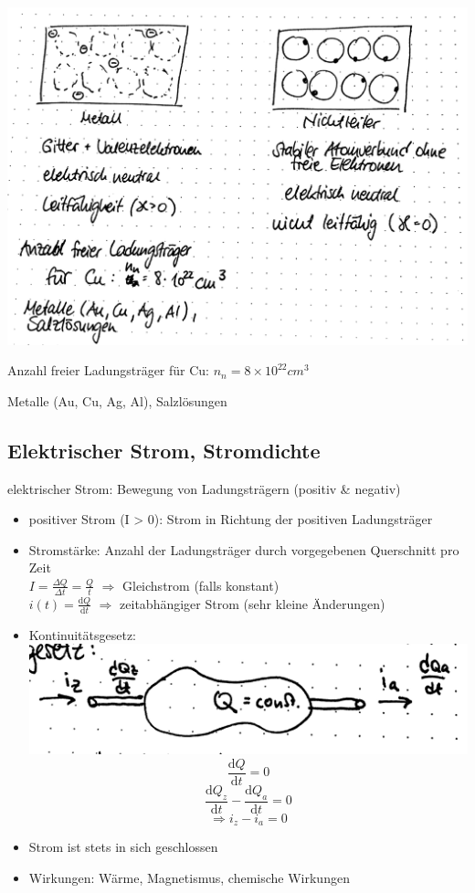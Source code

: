 \documentclass[10pt, a4paper]{article}
\newcommand{\Ra}{$\Rightarrow$ }
\newcommand{\delt}{\mathrm{d}}
\begin{document}
\includegraphics[width=\textwidth]{img/5}

Anzahl freier Ladungsträger für Cu: $n_n = 8 \times 10^{22}cm^3$

Metalle (Au, Cu, Ag, Al), Salzlösungen

\subsection{Elektrischer Strom, Stromdichte}

elektrischer Strom: Bewegung von Ladungsträgern (positiv \& negativ)

\begin{itemize}
	\item positiver Strom (I > 0): Strom in Richtung der positiven Ladungsträger
	\item Stromstärke: Anzahl der Ladungsträger durch vorgegebenen Querschnitt pro Zeit\\
		$I = \frac{\Delta Q}{\Delta t} = \frac{Q}{t}$ \Ra Gleichstrom (falls konstant)\\
		$i(t) = \frac{\mathrm{d}Q}{\mathrm{d}t}$ \Ra zeitabhängiger Strom (sehr kleine Änderungen)
	\item Kontinuitätsgesetz:\\
		\includegraphics[width=\textwidth]{img/6}
		$$\frac{\mathrm{d}Q}{\mathrm{d}t}=0$$
		$$\frac{\delt Q_z}{\delt t} - \frac{\delt Q_a}{\delt t} = 0$$
		$$\Rightarrow i_z - i_a = 0$$
	\item Strom ist stets in sich geschlossen
	\item Wirkungen: Wärme, Magnetismus, chemische Wirkungen
\end{itemize}
\end{document}

